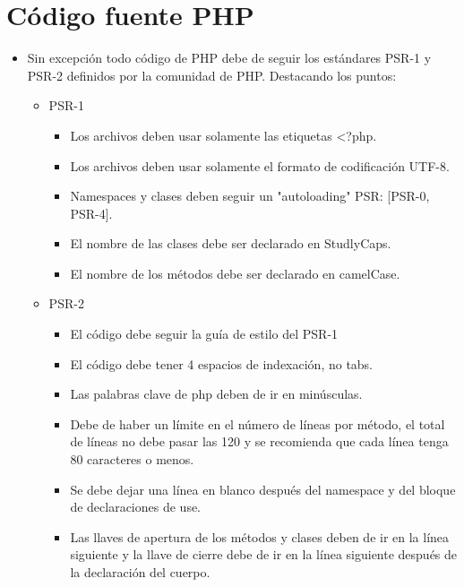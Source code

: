 \section{Código fuente PHP}
\begin{itemize}
\item Sin excepción todo código de PHP debe de seguir los estándares PSR-1 y PSR-2 definidos por la comunidad de PHP. Destacando los puntos:

	\begin{itemize}
		\item PSR-1
			\begin{itemize}
				\item Los archivos deben usar solamente las etiquetas <?php.
				\item Los archivos deben usar solamente el formato de codificación UTF-8.

				\item Namespaces y clases deben seguir un "autoloading" PSR: [PSR-0, PSR-4].

				\item El nombre de las clases debe ser declarado en StudlyCaps.
				\item El nombre de los métodos debe ser declarado en camelCase.
			\end{itemize}
			
			\item PSR-2
			\begin{itemize}
				\item El código debe seguir la guía de estilo del PSR-1

				\item El código debe tener 4 espacios de indexación, no tabs.

				\item Las palabras clave de php deben de ir en minúsculas.

				\item Debe de haber un límite en el número de líneas por método, el total de líneas no debe pasar las 120 y se recomienda que cada línea tenga 80 caracteres o menos.

				\item Se debe dejar una línea en blanco después del namespace y del bloque de declaraciones de use.

				\item Las llaves de apertura de los métodos y clases deben de ir en la línea siguiente y la llave de cierre debe de ir en la línea siguiente después de la declaración del cuerpo.


\end{itemize}
\end{itemize}
\end{itemize}

